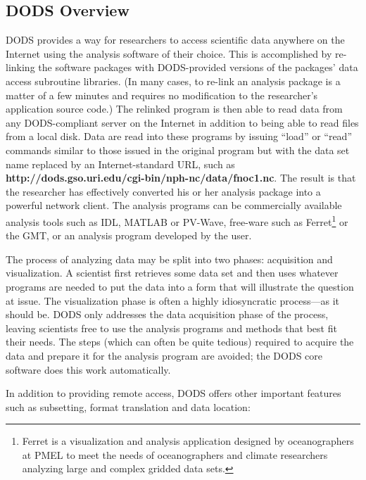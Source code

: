 \documentclass[12pt]{article}
\begin{document}
\subsection{\ac{DODS} Overview}\label{dods-details}

\ac{DODS} provides a way for researchers to access scientific data
anywhere on the Internet using the analysis software of their choice.
This is accomplished by re-linking the software packages with
\ac{DODS}-provided versions of the packages' data access subroutine
libraries. (In many cases, to re-link an analysis package is a matter
of a few minutes and requires no modification to the researcher's
application source code.)  The relinked program is then able to
read data from any \ac{DODS}-compliant server on the Internet in
addition to being able to read files from a local disk. Data are read
into these programs by issuing ``load'' or ``read'' commands similar
to those issued in the original program but with the data set name
replaced by an Internet-standard \ac{URL}, such as {\bf
http://dods.gso.uri.edu/cgi-bin/nph-nc/data/fnoc1.nc}.  The result is
that the researcher has effectively converted his or her analysis
package into a powerful network client. The analysis programs can be
commercially available analysis tools such as \ac{IDL}, \acl{MATLAB} 
or PV-Wave, free-ware such as Ferret\footnote{Ferret is a 
visualization and analysis application designed by oceanographers 
at \acs{PMEL} to meet the needs of oceanographers and climate 
researchers analyzing large and complex gridded data sets.} 
or the \ac{GMT}, or an analysis program developed by the user.

The process of analyzing data may be split into two phases: acquisition 
and visualization. A scientist first retrieves some data set and 
then uses whatever programs are needed to put the data into a form 
that will illustrate the question at issue. The visualization phase 
is often a highly idiosyncratic process---as it should be. \ac{DODS} 
only addresses the data acquisition phase of the process, leaving 
scientists free to use the analysis programs and methods that best 
fit their needs. The steps (which can often be quite tedious) required 
to acquire the data and prepare it for the analysis program are 
avoided; the \ac{DODS} core software does this work automatically.

In addition to providing remote access, \ac{DODS} offers other important
features such as subsetting, format translation and data location:
\end{document}
